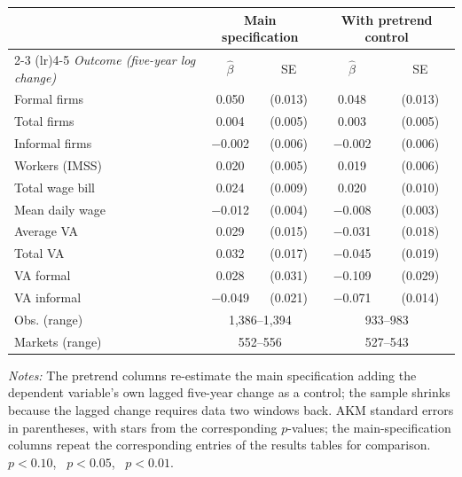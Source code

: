 \begin{threeparttable}
    \begin{tabular}{lcccc}
        \toprule
        & \multicolumn{2}{c}{\textbf{Main specification}} & \multicolumn{2}{c}{\textbf{With pretrend control}} \\
        \cmidrule(lr){2-3} \cmidrule(lr){4-5}
        \textit{Outcome (five-year log change)} & $\widehat{\beta}$ & SE & $\widehat{\beta}$ & SE \\
        \midrule
        Formal firms       & 0.050\sym{***} & (0.013) & 0.048\sym{***} & (0.013) \\
        Total firms        & 0.004          & (0.005) & 0.003          & (0.005) \\
        Informal firms     & $-$0.002       & (0.006) & $-$0.002       & (0.006) \\
        Workers (IMSS)     & 0.020\sym{***} & (0.005) & 0.019\sym{***} & (0.006) \\
        Total wage bill    & 0.024\sym{**}  & (0.009) & 0.020\sym{**}  & (0.010) \\
        Mean daily wage    & $-$0.012\sym{***} & (0.004) & $-$0.008\sym{**} & (0.003) \\
        Average VA         & 0.029\sym{*}   & (0.015) & $-$0.031\sym{*}   & (0.018) \\
        Total VA           & 0.032\sym{*}   & (0.017) & $-$0.045\sym{**}  & (0.019) \\
        VA formal          & 0.028          & (0.031) & $-$0.109\sym{***} & (0.029) \\
        VA informal        & $-$0.049\sym{**} & (0.021) & $-$0.071\sym{***} & (0.014) \\
        \midrule
        Obs. (range)    & \multicolumn{2}{c}{1{,}386--1{,}394} & \multicolumn{2}{c}{933--983} \\
        Markets (range) & \multicolumn{2}{c}{552--556} & \multicolumn{2}{c}{527--543} \\
        \bottomrule
    \end{tabular}
    \begin{tablenotes}[flushleft]
        \footnotesize
        \item \textit{Notes:} The pretrend columns re-estimate the main specification adding the dependent variable's own lagged five-year change as a control; the sample shrinks because the lagged change requires data two windows back. AKM standard errors in parentheses, with stars from the corresponding $p$-values; the main-specification columns repeat the corresponding entries of the results tables for comparison. \sym{*}~$p<0.10$, \sym{**}~$p<0.05$, \sym{***}~$p<0.01$.
    \end{tablenotes}
\end{threeparttable}